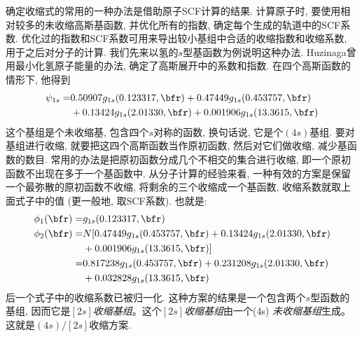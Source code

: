 确定收缩式的常用的一种办法是借助原子SCF计算的结果. 
计算原子时, 
要使用相对较多的未收缩高斯基函数, 
并优化所有的指数, 
确定每个生成的轨道中的SCF系数. 
优化过的指数和SCF系数可用来导出较小基组中合适的收缩指数和收缩系数, 
用于之后对分子的计算. 
我们先来以氢的$s$型基函数为例说明这种办法. 
Huzinaga曾用最小化氢原子能量的办法, 
确定了高斯展开中的系数和指数. 
在四个高斯函数的情形下, 
他得到
\begin{align}
	\psi_{1s} = &   0.50907g_{1s}(0.123317,\bfr) + 0.47449 g_{1s}(0.453757,\bfr) \notag\\
	& + 0.13424 g_{1s}(2.01330,\bfr) + 0.001906 g_{1s}(13.3615,\bfr)
\end{align}
这个基组是个未收缩基, 
包含四个$s$对称的函数, 
换句话说, 
它是个$(4s)$基组. 
要对基组进行收缩, 
就要把这四个高斯函数当作原初函数, 
然后对它们做收缩, 
减少基函数的数目. 
常用的办法是把原初函数分成几个不相交的集合进行收缩, 
即一个原初函数不出现在多于一个基函数中. 
从分子计算的经验来看, 
一种有效的方案是保留一个最弥散的原初函数不收缩, 
将剩余的三个收缩成一个基函数, 
收缩系数就取上面式子中的值 (更一般地, 
取SCF系数). 
也就是:
\begin{align}
	\phi_1(\bfr) = & g_{1s}(0.123317,\bfr)                                               \\
	\phi_2(\bfr) = & N[0.47449g_{1s}(0.453757,\bfr)+ 0.13424 g_{1s}(2.01330,\bfr) \notag \\
	& + 0.001906 g_{1s}(13.3615,\bfr)]                                    \notag \\
	=              & 0.817238g_{1s}(0.453757,\bfr)+ 0.231208 g_{1s}(2.01330,\bfr)  \notag\\
	& +0.032828 g_{1s}(13.3615,\bfr)
\end{align}
后一个式子中的收缩系数已被归一化. 
这种方案的结果是一个包含两个$s$型函数的基组, 
因而它是\emph{$[2s]$收缩基组}。这个\emph{$[2s]$收缩基组}由一个(4s) \emph{未收缩基组}生成。 
这就是$(4s)/[2s]$收缩方案.



